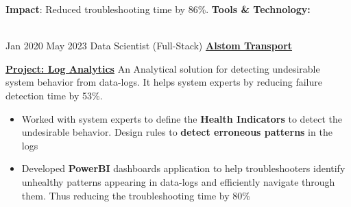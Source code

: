 \documentclass[letterpaper]{DS_class_file} %
\begin{document}
\begin{twenty}
{\begin{itemize}
        \newline \textbf{Impact}: Reduced troubleshooting time by 86\%.
        \newline \textbf{Tools \& Technology:} \textit{          }  
        \end{itemize}
        }
    \\
    \twentyitem
		{Jan 2020}
		{May 2023}
		{Data Scientist (Full-Stack)}
		{\href{https://www.alstom.com/alstom-india}{\textbf{Alstom Transport}}}
		{}
		{
        \underline{\textbf{Project: Log Analytics}}
        An Analytical solution for detecting undesirable system behavior from data-logs. It helps system experts by reducing failure detection time by 53\%.
        \begin{itemize}
                \item Worked with system experts to define the \textbf{Health Indicators} to detect the undesirable behavior. Design rules to \textbf{detect erroneous patterns} in the logs 
                \item Developed \textbf{PowerBI} dashboards application to help troubleshooters identify unhealthy patterns appearing in data-logs and efficiently navigate through them. Thus reducing the troubleshooting time by 80\%

\end{itemize}}
\end{twenty}
\end{document}
